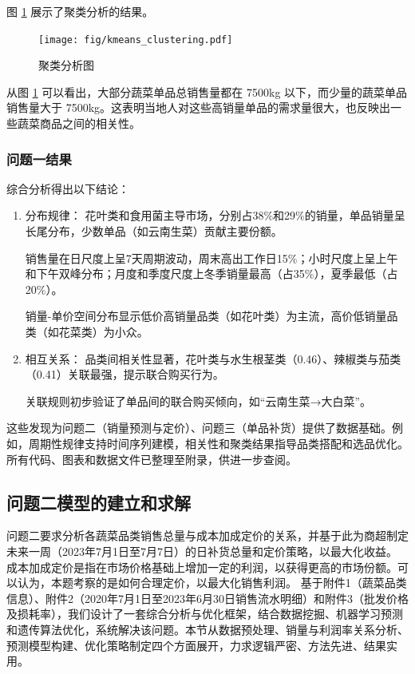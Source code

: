 \documentclass{cumcmthesis} %
\begin{document}
   图 \ref{fig:cluster_analysis} 展示了聚类分析的结果。
   \begin{figure}[H]
       \centering
       \texttt{[image: fig/kmeans\_clustering.pdf]}
       \caption{聚类分析图}
       \label{fig:cluster_analysis}
   \end{figure}
   
   从图 \ref{fig:cluster_analysis} 可以看出，大部分蔬菜单品总销售量都在 7500kg 以下，而少量的蔬菜单品销售量大于 7500kg。这表明当地人对这些高销量单品的需求量很大，也反映出一些蔬菜商品之间的相关性。








\subsubsection{问题一结果}
综合分析得出以下结论：

\begin{enumerate}

    \item 分布规律：
    花叶类和食用菌主导市场，分别占38\%和29\%的销量，单品销量呈长尾分布，少数单品（如云南生菜）贡献主要份额。
    
    
    销售量在日尺度上呈7天周期波动，周末高出工作日15\%；小时尺度上呈上午和下午双峰分布；月度和季度尺度上冬季销量最高（占35\%），夏季最低（占20\%）。
    
    
    销量-单价空间分布显示低价高销量品类（如花叶类）为主流，高价低销量品类（如花菜类）为小众。
    \item 相互关系：
    品类间相关性显著，花叶类与水生根茎类（0.46）、辣椒类与茄类（0.41）关联最强，提示联合购买行为。
    
    关联规则初步验证了单品间的联合购买倾向，如“云南生菜→大白菜”。
    
\end{enumerate}

这些发现为问题二（销量预测与定价）、问题三（单品补货）提供了数据基础。例如，周期性规律支持时间序列建模，相关性和聚类结果指导品类搭配和选品优化。所有代码、图表和数据文件已整理至附录，供进一步查阅。





\subsection{问题二模型的建立和求解}
问题二要求分析各蔬菜品类销售总量与成本加成定价的关系，并基于此为商超制定未来一周（2023年7月1日至7月7日）的日补货总量和定价策略，以最大化收益。
成本加成定价是指在市场价格基础上增加一定的利润，以获得更高的市场份额。可以认为，本题考察的是如何合理定价，以最大化销售利润。
基于附件1（蔬菜品类信息）、附件2（2020年7月1日至2023年6月30日销售流水明细）和附件3（批发价格及损耗率），我们设计了一套综合分析与优化框架，结合数据挖掘、机器学习预测和遗传算法优化，系统解决该问题。本节从数据预处理、销量与利润率关系分析、预测模型构建、优化策略制定四个方面展开，力求逻辑严密、方法先进、结果实用。
\end{document}

